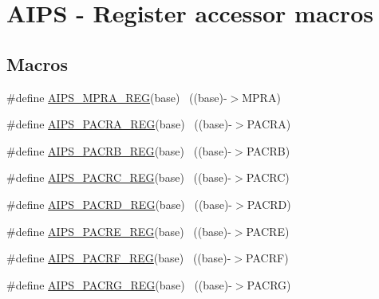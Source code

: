 \hypertarget{group___a_i_p_s___register___accessor___macros}{}\section{A\+I\+PS -\/ Register accessor macros}
\label{group___a_i_p_s___register___accessor___macros}
\subsection*{Macros}
\begin{DoxyCompactItemize}
\item 
\#define \hyperlink{group___a_i_p_s___register___accessor___macros_ga152616308133cf4081eccd2218dcc92f}{A\+I\+P\+S\+\_\+\+M\+P\+R\+A\+\_\+\+R\+EG}(base)                                        ~((base)-\/$>$M\+P\+RA)
\item 
\#define \hyperlink{group___a_i_p_s___register___accessor___macros_ga34c1a4290c1592d146062320c02a9a6a}{A\+I\+P\+S\+\_\+\+P\+A\+C\+R\+A\+\_\+\+R\+EG}(base)                                      ~((base)-\/$>$P\+A\+C\+RA)
\item 
\#define \hyperlink{group___a_i_p_s___register___accessor___macros_ga9ef244a0063130484f0c49a3d504fc5b}{A\+I\+P\+S\+\_\+\+P\+A\+C\+R\+B\+\_\+\+R\+EG}(base)                                      ~((base)-\/$>$P\+A\+C\+RB)
\item 
\#define \hyperlink{group___a_i_p_s___register___accessor___macros_ga78c7a08f917ec00d68544b8463bbb06b}{A\+I\+P\+S\+\_\+\+P\+A\+C\+R\+C\+\_\+\+R\+EG}(base)                                      ~((base)-\/$>$P\+A\+C\+RC)
\item 
\#define \hyperlink{group___a_i_p_s___register___accessor___macros_ga60f95b6f529c1f86b3fa90f2dfabe604}{A\+I\+P\+S\+\_\+\+P\+A\+C\+R\+D\+\_\+\+R\+EG}(base)                                      ~((base)-\/$>$P\+A\+C\+RD)
\item 
\#define \hyperlink{group___a_i_p_s___register___accessor___macros_ga0ffe27f782cfd17219262c14978ba385}{A\+I\+P\+S\+\_\+\+P\+A\+C\+R\+E\+\_\+\+R\+EG}(base)                                      ~((base)-\/$>$P\+A\+C\+RE)
\item 
\#define \hyperlink{group___a_i_p_s___register___accessor___macros_ga01a04977f704838f7aecf35adfaaa5f6}{A\+I\+P\+S\+\_\+\+P\+A\+C\+R\+F\+\_\+\+R\+EG}(base)                                      ~((base)-\/$>$P\+A\+C\+RF)
\item 
\#define \hyperlink{group___a_i_p_s___register___accessor___macros_ga3dfe3bc1cba527813e4c6e8edb0754c8}{A\+I\+P\+S\+\_\+\+P\+A\+C\+R\+G\+\_\+\+R\+EG}(base)                                      ~((base)-\/$>$P\+A\+C\+RG)

\end{DoxyCompactItemize}
